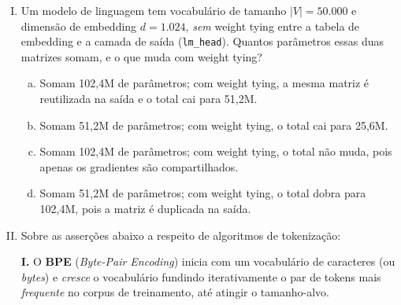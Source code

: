 \documentclass{dlproblemset}
\begin{document}
\begin{enumerate}[I)]
\begin{enumerate}[a)]
    \item O token colidia com um token especial de controle, e o modelo o
          interpretava como marcador de fim de documento.
    \item O token continha bytes fora do intervalo UTF-8 válido, corrompendo o
          mapeamento byte-para-unicode usado na decodificação da saída.
    \item O vocabulário foi aprendido num corpus diferente do usado para treinar
          o modelo, deixando o embedding do token subtreinado.
    \item O token era longo demais e foi truncado em bytes inválidos durante a
          codificação da entrada pelo tokenizer.
\end{enumerate}

\item Um modelo de linguagem tem vocabulário de tamanho $|V| = 50.000$ e dimensão
      de embedding $d = 1.024$, \emph{sem} weight tying entre a tabela de embedding
      e a camada de saída (\texttt{lm\_head}). Quantos parâmetros essas duas
      matrizes somam, e o que muda com weight tying?

\begin{enumerate}[a)]
    \item Somam 102,4M de parâmetros; com weight tying, a mesma matriz é reutilizada
          na saída e o total cai para 51,2M.
    \item Somam 51,2M de parâmetros; com weight tying, o total cai para 25,6M.
    \item Somam 102,4M de parâmetros; com weight tying, o total não muda, pois
          apenas os gradientes são compartilhados.
    \item Somam 51,2M de parâmetros; com weight tying, o total dobra para 102,4M,
          pois a matriz é duplicada na saída.
\end{enumerate}

\item Sobre as asserções abaixo a respeito de algoritmos de tokenização:

\textbf{I.} O \textbf{BPE} (\textit{Byte-Pair Encoding}) inicia com um vocabulário de caracteres (ou \textit{bytes}) e \emph{cresce} o vocabulário fundindo iterativamente o par de tokens mais \emph{frequente} no corpus de treinamento, até atingir o tamanho-alvo.


\end{enumerate}
\end{document}
